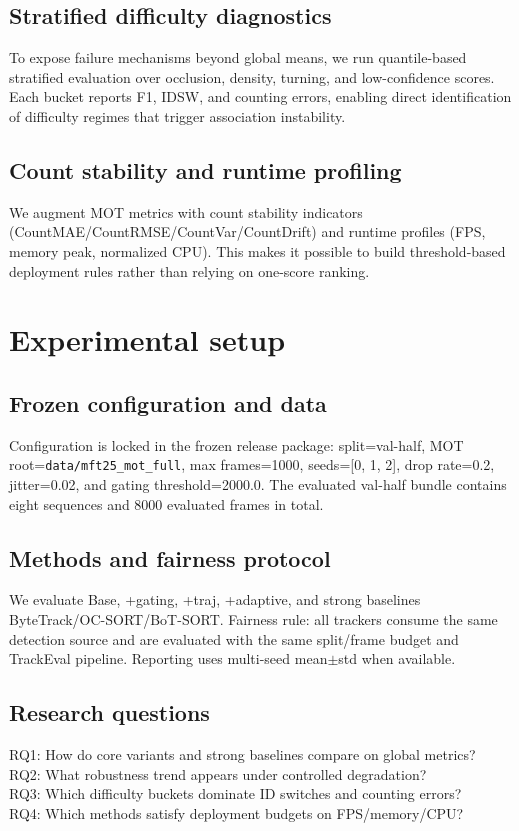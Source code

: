 \documentclass[preprint,12pt]{elsarticle}
\begin{document}
\subsection{Stratified difficulty diagnostics}
To expose failure mechanisms beyond global means, we run quantile-based stratified evaluation over occlusion, density, turning, and low-confidence scores. Each bucket reports F1, IDSW, and counting errors, enabling direct identification of difficulty regimes that trigger association instability.

\subsection{Count stability and runtime profiling}
We augment MOT metrics with count stability indicators (CountMAE/CountRMSE/CountVar/CountDrift) and runtime profiles (FPS, memory peak, normalized CPU). This makes it possible to build threshold-based deployment rules rather than relying on one-score ranking.

\section{Experimental setup}
\subsection{Frozen configuration and data}
Configuration is locked in the frozen release package: split=val-half, MOT root=\texttt{data/mft25\_mot\_full}, max frames=1000, seeds=[0, 1, 2], drop rate=0.2, jitter=0.02, and gating threshold=2000.0. The evaluated val-half bundle contains eight sequences and 8000 evaluated frames in total.

\subsection{Methods and fairness protocol}
We evaluate Base, +gating, +traj, +adaptive, and strong baselines ByteTrack/OC-SORT/BoT-SORT. Fairness rule: all trackers consume the same detection source and are evaluated with the same split/frame budget and TrackEval pipeline. Reporting uses multi-seed mean$\pm$std when available.

\subsection{Research questions}
RQ1: How do core variants and strong baselines compare on global metrics?\\
RQ2: What robustness trend appears under controlled degradation?\\
RQ3: Which difficulty buckets dominate ID switches and counting errors?\\
RQ4: Which methods satisfy deployment budgets on FPS/memory/CPU?
\end{document}
